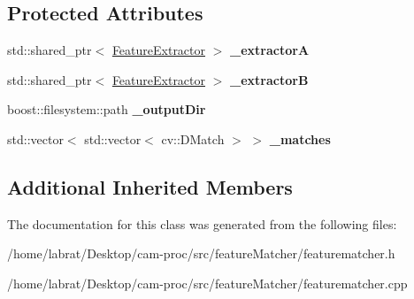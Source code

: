 \subsection*{Protected Attributes}
\begin{DoxyCompactItemize}
\item 
std\+::shared\+\_\+ptr$<$ \hyperlink{classFeatureExtractor}{Feature\+Extractor} $>$ {\bfseries \+\_\+extractorA}\hypertarget{classFeatureMatcher_a830a58174a72a7887152f393e17f76fb}{}\label{classFeatureMatcher_a830a58174a72a7887152f393e17f76fb}

\item 
std\+::shared\+\_\+ptr$<$ \hyperlink{classFeatureExtractor}{Feature\+Extractor} $>$ {\bfseries \+\_\+extractorB}\hypertarget{classFeatureMatcher_a623222ed94856a26d76b9b1195b0d7ed}{}\label{classFeatureMatcher_a623222ed94856a26d76b9b1195b0d7ed}

\item 
boost\+::filesystem\+::path {\bfseries \+\_\+output\+Dir}\hypertarget{classFeatureMatcher_a82a41101ee2fa1a9980757070ec47132}{}\label{classFeatureMatcher_a82a41101ee2fa1a9980757070ec47132}

\item 
std\+::vector$<$ std\+::vector$<$ cv\+::\+D\+Match $>$ $>$ {\bfseries \+\_\+matches}\hypertarget{classFeatureMatcher_a5b6c1aec66dc09e5eb709dce4b5635dd}{}\label{classFeatureMatcher_a5b6c1aec66dc09e5eb709dce4b5635dd}

\end{DoxyCompactItemize}
\subsection*{Additional Inherited Members}


The documentation for this class was generated from the following files\+:\begin{DoxyCompactItemize}
\item 
/home/labrat/\+Desktop/cam-\/proc/src/feature\+Matcher/featurematcher.\+h\item 
/home/labrat/\+Desktop/cam-\/proc/src/feature\+Matcher/featurematcher.\+cpp\end{DoxyCompactItemize}
